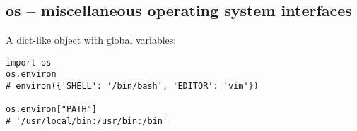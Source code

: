 \subsection{os -- miscellaneous operating system interfaces}
A dict-like object with global variables:
\begin{verbatim}
import os
os.environ
# environ({'SHELL': '/bin/bash', 'EDITOR': 'vim'})

os.environ["PATH"]
# '/usr/local/bin:/usr/bin:/bin'
\end{verbatim}

